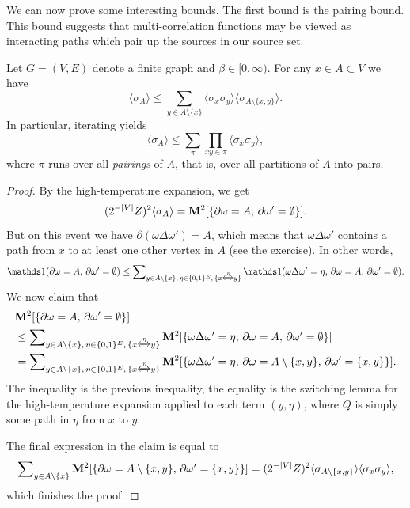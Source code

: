 We can now prove some interesting bounds.
The first bound is the pairing bound.
This bound suggests that multi-correlation functions may be viewed
as interacting paths which pair up the sources in our source set.

\begin{theorem}
    \label{thm:pairing}
    Let $G=(V,E)$ denote a finite graph and $\beta\in[0,\infty)$.
    For any $x\in A\subset V$ we have
    \begin{equation}
        \langle\sigma_A\rangle
        \leq
        \sum_{y\in A\setminus\{x\}}
        \langle\sigma_x\sigma_y\rangle
        \langle \sigma_{A\setminus\{x,y\}}\rangle.
    \end{equation}
    In particular, iterating yields
    \[
        \langle\sigma_A\rangle
        \leq
        \sum_{\pi}
        \prod_{xy\in\pi}
        \langle\sigma_x\sigma_y\rangle,
    \]
    where $\pi$ runs over all \emph{pairings} of $A$,
    that is, over all partitions of $A$ into pairs.
\end{theorem}

\begin{proof}
    By the high-temperature expansion,
    we get
    \[
        (2^{-|V|}Z)^2 \langle\sigma_A\rangle
        =
        \mathbf{M}^2[\{\partial\omega = A,\,\partial\omega'=\emptyset\}].
    \]
    But on this event we have $\partial(\omega\Delta\omega')=A$,
    which means that $\omega\Delta\omega'$ contains a path
    from $x$ to at least one other vertex in $A$ (see the exercise).
    In other words,
    \[
        \true{\partial\omega = A,\,\partial\omega'=\emptyset}
        \leq
        \sum\nolimits_{y\in A\setminus\{x\},\,\eta\in\{0,1\}^E,\,\{x\xleftrightarrow{\eta}y\}}
        \true{\omega\Delta\omega'=\eta,\,\partial\omega = A,\,\partial\omega'=\emptyset}.
    \]
    We now claim that
    \begin{align}
        &\mathbf{M}^2[\{\partial\omega = A,\,\partial\omega'=\emptyset\}]
        \\&\leq
        \sum\nolimits_{y\in A\setminus\{x\},\,\eta\in\{0,1\}^E,\,\{x\xleftrightarrow{\eta}y\}}
        \mathbf{M}^2[
            \{\omega\Delta\omega'=\eta,\,\partial\omega = A,\,\partial\omega'=\emptyset\}
        ]
        \\&=
        \sum\nolimits_{y\in A\setminus\{x\},\,\eta\in\{0,1\}^E,\,\{x\xleftrightarrow{\eta}y\}}
        \mathbf{M}^2[
            \{\omega\Delta\omega'=\eta,\,\partial\omega =
            A\setminus\{x,y\},\,\partial\omega'=\{x,y\}\}
        ].
    \end{align}
    The inequality is the previous inequality,
    the equality is the switching lemma for the high-temperature expansion
    applied to each term $(y,\eta)$,
    where $Q$ is simply some path in $\eta$ from $x$ to $y$.

    The final expression in the claim is equal to
    \[
        \sum\nolimits_{y\in A\setminus\{x\}}
        \mathbf{M}^2[
            \{\partial\omega = A\setminus\{x,y\},\,\partial\omega'=\{x,y\}\}
        ]
        =
        (2^{-|V|}Z)^2 \langle\sigma_{A\setminus\{x,y\}}\rangle\langle\sigma_x\sigma_y\rangle,
    \]
    which finishes the proof.
\end{proof}

